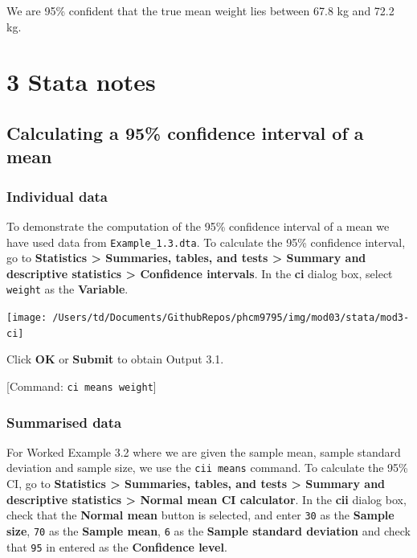 \documentclass[
]{memoir}
\begin{document}
We are 95\% confident that the true mean weight lies between 67.8 kg and 72.2 kg.

\hypertarget{stata-notes-1}{%
\chapter*{\texorpdfstring{\textbf{3} Stata notes}{3 Stata notes}}\label{stata-notes-1}}

\hypertarget{calculating-a-95-confidence-interval-of-a-mean}{%
\section{Calculating a 95\% confidence interval of a mean}\label{calculating-a-95-confidence-interval-of-a-mean}}

\hypertarget{individual-data}{%
\subsection{Individual data}\label{individual-data}}

To demonstrate the computation of the 95\% confidence interval of a mean we have used data from \texttt{Example\_1.3.dta}. To calculate the 95\% confidence interval, go to \textbf{Statistics \textgreater{} Summaries, tables, and tests \textgreater{} Summary and descriptive statistics \textgreater{} Confidence intervals}. In the \textbf{ci} dialog box, select \texttt{weight} as the \textbf{Variable}.

\texttt{[image: /Users/td/Documents/GithubRepos/phcm9795/img/mod03/stata/mod3-ci]}

Click \textbf{OK} or \textbf{Submit} to obtain Output 3.1.

{[}Command: \texttt{ci\ means\ weight}{]}

\hypertarget{summarised-data}{%
\subsection{Summarised data}\label{summarised-data}}

For Worked Example 3.2 where we are given the sample mean, sample standard deviation and sample size, we use the \texttt{cii\ means} command. To calculate the 95\% CI, go to \textbf{Statistics \textgreater{} Summaries, tables, and tests \textgreater{} Summary and descriptive statistics \textgreater{} Normal mean CI calculator}. In the \textbf{cii} dialog box, check that the \textbf{Normal mean} button is selected, and enter \texttt{30} as the \textbf{Sample size}, \texttt{70} as the \textbf{Sample mean}, \texttt{6} as the \textbf{Sample standard deviation} and check that \texttt{95} in entered as the \textbf{Confidence level}.
\end{document}
